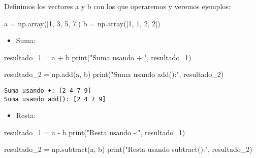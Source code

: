 \documentclass[
  letterpaper,
  DIV=11,
  numbers=noendperiod]{scrreprt}
\newenvironment{Shaded}{\begin{snugshade}}{\end{snugshade}}
\newcommand{\BuiltInTok}[1]{\textcolor[rgb]{0.00,0.23,0.31}{#1}}
\newcommand{\DecValTok}[1]{\textcolor[rgb]{0.68,0.00,0.00}{#1}}
\newcommand{\NormalTok}[1]{\textcolor[rgb]{0.00,0.23,0.31}{#1}}
\newcommand{\OperatorTok}[1]{\textcolor[rgb]{0.37,0.37,0.37}{#1}}
\newcommand{\StringTok}[1]{\textcolor[rgb]{0.13,0.47,0.30}{#1}}
\providecommand{\tightlist}{%
  \setlength{\itemsep}{0pt}\setlength{\parskip}{0pt}}\usepackage{longtable,booktabs,array}
\begin{document}
Definimos los vectores a y b con los que operaremos y veremos ejemplos:

\begin{Shaded}
\begin{Highlighting}[]
\NormalTok{a }\OperatorTok{=}\NormalTok{ np.array([}\DecValTok{1}\NormalTok{, }\DecValTok{3}\NormalTok{, }\DecValTok{5}\NormalTok{, }\DecValTok{7}\NormalTok{])}
\NormalTok{b }\OperatorTok{=}\NormalTok{ np.array([}\DecValTok{1}\NormalTok{, }\DecValTok{1}\NormalTok{, }\DecValTok{2}\NormalTok{, }\DecValTok{2}\NormalTok{])}
\end{Highlighting}
\end{Shaded}

\begin{itemize}
\tightlist
\item
  Suma:
\end{itemize}

\begin{Shaded}
\begin{Highlighting}[]
\NormalTok{resultado\_1 }\OperatorTok{=}\NormalTok{ a }\OperatorTok{+}\NormalTok{ b}
\BuiltInTok{print}\NormalTok{(}\StringTok{"Suma usando +:"}\NormalTok{, resultado\_1) }

\NormalTok{resultado\_2 }\OperatorTok{=}\NormalTok{ np.add(a, b)}
\BuiltInTok{print}\NormalTok{(}\StringTok{"Suma usando add():"}\NormalTok{, resultado\_2) }
\end{Highlighting}
\end{Shaded}

\begin{verbatim}
Suma usando +: [2 4 7 9]
Suma usando add(): [2 4 7 9]
\end{verbatim}

\begin{itemize}
\tightlist
\item
  Resta:
\end{itemize}

\begin{Shaded}
\begin{Highlighting}[]
\NormalTok{resultado\_1 }\OperatorTok{=}\NormalTok{ a }\OperatorTok{{-}}\NormalTok{ b}
\BuiltInTok{print}\NormalTok{(}\StringTok{"Resta usando {-}:"}\NormalTok{, resultado\_1) }

\NormalTok{resultado\_2 }\OperatorTok{=}\NormalTok{ np.subtract(a, b)}
\BuiltInTok{print}\NormalTok{(}\StringTok{"Resta usando subtract():"}\NormalTok{, resultado\_2) }
\end{Highlighting}
\end{Shaded}
\end{document}
